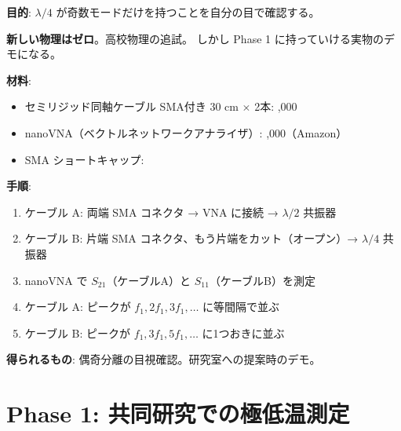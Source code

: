 \documentclass[12pt,a4paper]{article}
\begin{document}
\begin{expbox}[室温テスト: 7,000 円]
\textbf{目的}: $\lambda/4$ が奇数モードだけを持つことを自分の目で確認する。

\textbf{新しい物理はゼロ}。高校物理の追試。
しかし Phase 1 に持っていける実物のデモになる。

\textbf{材料}:
\begin{itemize}
\item セミリジッド同軸ケーブル SMA付き 30 cm $\times$ 2本: ,000
\item nanoVNA（ベクトルネットワークアナライザ）: ,000（Amazon）
\item SMA ショートキャップ: 
\end{itemize}

\textbf{手順}:
\begin{enumerate}
\item ケーブル A: 両端 SMA コネクタ → VNA に接続 → $\lambda/2$ 共振器
\item ケーブル B: 片端 SMA コネクタ、もう片端をカット（オープン）→ $\lambda/4$ 共振器
\item nanoVNA で $S_{21}$（ケーブルA）と $S_{11}$（ケーブルB）を測定
\item ケーブル A: ピークが $f_1, 2f_1, 3f_1, \ldots$ に等間隔で並ぶ
\item ケーブル B: ピークが $f_1, 3f_1, 5f_1, \ldots$ に1つおきに並ぶ
\end{enumerate}

\textbf{得られるもの}: 偶奇分離の目視確認。研究室への提案時のデモ。
\end{expbox}

\section{Phase 1: 共同研究での極低温測定}
\end{document}
